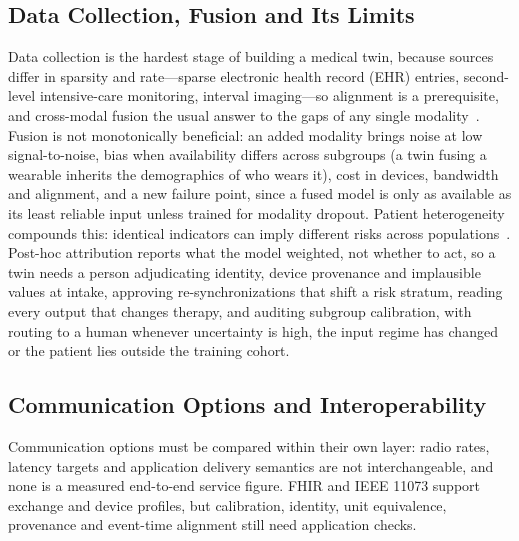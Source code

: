 \documentclass[journal]{IEEEtran}
\begin{document}
\subsection{Data Collection, Fusion and Its Limits}
Data collection is the hardest stage of building a medical twin, because sources differ in sparsity and rate---sparse electronic health record (EHR) entries, second-level intensive-care monitoring, interval imaging---so alignment is a prerequisite, and cross-modal fusion the usual answer to the gaps of any single modality~\cite{baltrusaitis2019multimodal}. Fusion is not monotonically beneficial: an added modality brings noise at low signal-to-noise, bias when availability differs across subgroups (a twin fusing a wearable inherits the demographics of who wears it), cost in devices, bandwidth and alignment, and a new failure point, since a fused model is only as available as its least reliable input unless trained for modality dropout. Patient heterogeneity compounds this: identical indicators can imply different risks across populations~\cite{obermeyer2016predicting}. Post-hoc attribution reports what the model weighted, not whether to act, so a twin needs a person adjudicating identity, device provenance and implausible values at intake, approving re-synchronizations that shift a risk stratum, reading every output that changes therapy, and auditing subgroup calibration, with routing to a human whenever uncertainty is high, the input regime has changed or the patient lies outside the training cohort.

\subsection{Communication Options and Interoperability}
\label{sec:protocols}
Communication options must be compared within their own layer: radio rates, latency targets and application delivery semantics are not interchangeable, and none is a measured end-to-end service figure. FHIR and IEEE 11073 support exchange and device profiles, but calibration, identity, unit equivalence, provenance and event-time alignment still need application checks.
\end{document}
